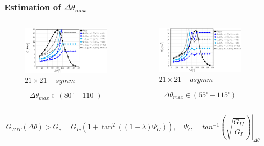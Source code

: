 \documentclass[first,firstsupp,lastsupp,last,hyperref,table]{ETHclass}
\begin{document}
\addtocounter{framenumber}{-1}

\begin{frame}
\frametitle{\vspace{0.2cm}\small Estimation of $\Delta\theta_{max}$}
\vspace{-1.25cm}
\centering
\begin{columns}[c]
\centering
\begin{column}{0.5\textwidth}
\centering
\begin{figure}
\centering
\caption{\scriptsize $21\times 21-symm$}
\includegraphics[width=\columnwidth]{vf60-dsize-S10A0vk.pdf}
\end{figure}
\scriptsize
\begin{equation*}
\Delta\theta_{max}\in\left(80^{\circ}-110^{\circ}\right)
\end{equation*}
\end{column}
\begin{column}{0.5\textwidth}
\centering
\begin{figure}
\centering
\caption{\scriptsize$21\times 21-asymm$}
\includegraphics[width=\columnwidth]{vf60-dsize-S10A0asymm.pdf}
\end{figure}
\scriptsize
\begin{equation*}
\Delta\theta_{max}\in\left(55^{\circ}-115^{\circ}\right)
\end{equation*}
\end{column}
\end{columns}
\scriptsize
\vspace{0.25cm}
\begin{equation*}
G_{TOT}\left(\Delta\theta\right)>G_{c}=G_{Ic}\left(1+\tan^{2}\left(\left(1-\lambda\right)\Psi_{G}\right)\right),\quad\Psi_{G}=\left.tan^{-1}\left(\sqrt{\frac{G_{II}}{G_{I}}}\right)\right|_{\Delta\theta}
\end{equation*}
\end{frame}
\end{document}
